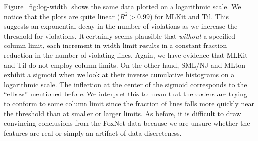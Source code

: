 \documentclass[12pt,abstracton]{scrartcl}
\begin{document}
Figure~\ref{fig:log-width} shows the same data plotted on a logarithmic scale.
We notice that the plots are quite linear ($R^{2} > 0.99$) for MLKit and Til.
This suggests an exponential decay in the number of violations as we increase the
threshold for violations. It certainly seems plausible that \emph{without} a
specified column limit, each increment in width limit results in a constant
fraction reduction in the number of violating lines.
Again, we have evidence that MLKit and Til do not employ column limits.
On the other hand, SML/NJ
and MLton exhibit a sigmoid when we look at their inverse cumulative histograms
on a logarithmic scale. The inflection at the center of the sigmoid corresponds to
the ``elbow'' mentioned before. We interpret this to mean that the coders are trying
to conform to some column limit since the fraction of lines falls more quickly near
the threshold than at smaller or larger limits. As before, it is difficult to
draw convincing conclusions from the FoxNet data because we are unsure
whether the features are real or simply an artifact of data discreteness.
\end{document}
